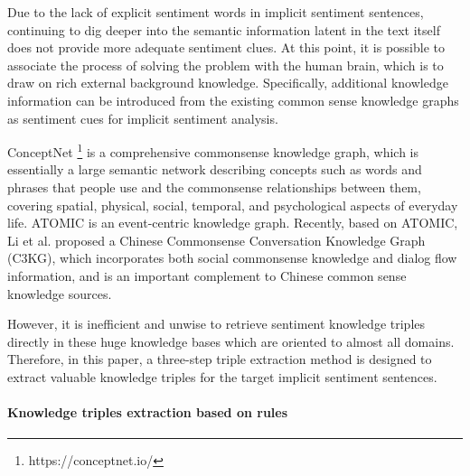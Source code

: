 Due to the lack of explicit sentiment words in implicit sentiment sentences, continuing to dig deeper into the semantic information latent in the text itself does not provide more adequate sentiment clues.
At this point, it is possible to associate the process of solving the problem with the human brain, which is to draw on rich external background knowledge.
Specifically, additional knowledge information can be introduced from the existing common sense knowledge graphs as sentiment cues for implicit sentiment analysis.

ConceptNet \footnote{https://conceptnet.io/} is a comprehensive commonsense knowledge graph, which is essentially a large semantic network describing concepts such as words and phrases that people use and the commonsense relationships between them, covering spatial, physical, social, temporal, and psychological aspects of everyday life.
ATOMIC \cite{sap2019atomic} is an event-centric knowledge graph. Recently, based on ATOMIC, Li et al. \cite{li2022c3kg} proposed a Chinese Commonsense Conversation Knowledge Graph (C3KG), which incorporates both social commonsense knowledge and dialog flow information, and is an important complement to Chinese common sense knowledge sources.

However, it is inefficient and unwise to retrieve sentiment knowledge triples directly in these huge knowledge bases which are oriented to almost all domains. Therefore, in this paper, a three-step triple extraction method is designed to extract valuable knowledge triples for the target implicit sentiment sentences.


\paragraph{Knowledge triples extraction based on rules}

